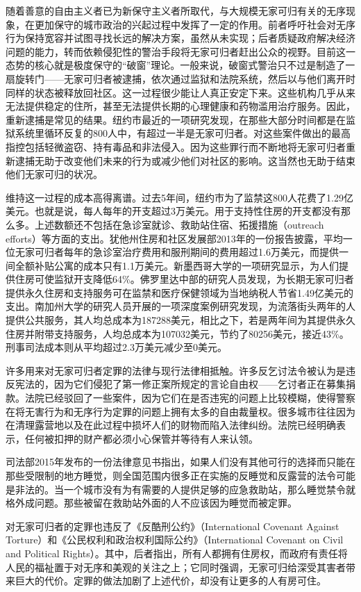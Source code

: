 \documentclass[fontset=fandol, a4paper, 12pt, openright]{ctexbook}
\begin{document}
随着善意的自由主义者已为新保守主义者所取代，与大规模无家可归有关的无序现象，在更加保守的城市政治的兴起过程中发挥了一定的作用。前者呼吁社会对无序行为保持宽容并试图寻找长远的解决方案，虽然从未实现；后者质疑政府解决经济问题的能力，转而依赖侵犯性的警治手段将无家可归者赶出公众的视野。目前这一态势的核心就是极度保守的“破窗”理论。一般来说，破窗式警治只不过是制造了一扇旋转门——无家可归者被逮捕，依次通过监狱和法院系统，然后以与他们离开时同样的状态被释放回社区。这一过程很少能让人真正安定下来。这些机构几乎从来无法提供稳定的住所，甚至无法提供长期的心理健康和药物滥用治疗服务。因此，重新逮捕是常见的结果。纽约市最近的一项研究发现，在那些大部分时间都是在监狱系统里循环反复的800人中，有超过一半是无家可归者。对这些案件做出的最高指控包括轻微盗窃、持有毒品和非法侵入。因为这些罪行而不断地将无家可归者重新逮捕无助于改变他们未来的行为或减少他们对社区的影响。这当然也无助于结束他们无家可归的状况。

维持这一过程的成本高得离谱。过去5年间，纽约市为了监禁这800人花费了1.29亿美元。也就是说，每人每年的开支超过3万美元。用于支持性住房的开支都没有那么多。上述数额还不包括在急诊室就诊、救助站住宿、拓援措施（outreach efforts）等方面的支出。犹他州住房和社区发展部2013年的一份报告披露，平均一位无家可归者每年的急诊室治疗费用和服刑期间的费用超过1.6万美元，而提供一间全额补贴公寓的成本只有1.1万美元。新墨西哥大学的一项研究显示，为人们提供住房可使监狱开支降低64\%。佛罗里达中部的研究人员发现，为长期无家可归者提供永久住房和支持服务可在监禁和医疗保健领域为当地纳税人节省1.49亿美元的支出。南加州大学的研究人员开展的一项深度案例研究发现，为流落街头两年的人提供公共服务，其人均总成本为187288美元，相比之下，若是两年间为其提供永久住房并附带支持服务，人均总成本为107032美元，节约了80256美元，接近43\%。刑事司法成本则从平均超过2.3万美元减少至0美元。

许多用来对无家可归者定罪的法律与现行法律相抵触。许多反乞讨法令被认为是违反宪法的，因为它们侵犯了第一修正案所规定的言论自由权——乞讨者正在募集捐款。法院已经驳回了一些案件，因为它们在是否违宪的问题上比较模糊，使得警察在将无害行为和无序行为定罪的问题上拥有太多的自由裁量权。很多城市往往因为在清理露营地以及在此过程中损坏人们的财物而陷入法律纠纷。法院已经明确表示，任何被扣押的财产都必须小心保管并等待有人来认领。

司法部2015年发布的一份法律意见书指出，如果人们没有其他可行的选择而只能在那些受限制的地方睡觉，则全国范围内很多正在实施的反睡觉和反露营的法令可能是非法的。当一个城市没有为有需要的人提供足够的应急救助站，那么睡觉禁令就格外成问题。那些被留在救助站外面的人不应该因为睡觉而被定罪。

对无家可归者的定罪也违反了《反酷刑公约》（International Covenant Against Torture）和《公民权利和政治权利国际公约》（International Covenant on Civil and Political Rights）。其中，后者指出，所有人都拥有住房权，而政府有责任将人民的福祉置于对无序和美观的关注之上；它同时强调，无家可归给深受其害者带来巨大的代价。定罪的做法加剧了上述代价，却没有让更多的人有房可住。
\end{document}
